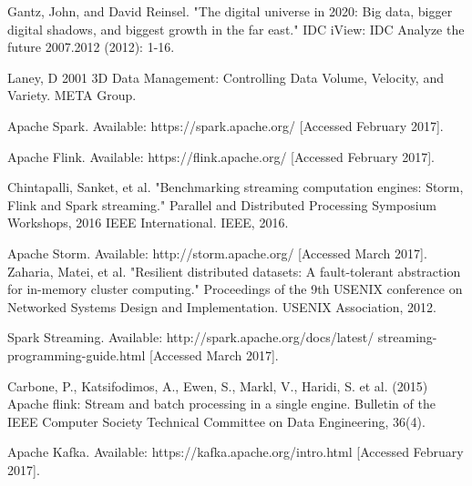 \documentclass[]{article}
\begin{document}
\begin{thebibliography}{[MT1]}
%
Gantz, John, and David Reinsel. "The digital universe in 2020: Big data, bigger digital shadows, and biggest growth in the far east." IDC iView: IDC Analyze the future 2007.2012 (2012): 1-16.

Laney, D 2001 3D Data Management: Controlling Data Volume, Velocity, and Variety. META Group.

Apache Spark. Available: https://spark.apache.org/ [Accessed February 2017].

Apache Flink. Available: https://flink.apache.org/ [Accessed February 2017].

Chintapalli, Sanket, et al. "Benchmarking streaming computation engines: Storm, Flink and Spark streaming." Parallel and Distributed Processing Symposium Workshops, 2016 IEEE International. IEEE, 2016.

Apache Storm. Available: http://storm.apache.org/ [Accessed March 2017].
Zaharia, Matei, et al. "Resilient distributed datasets: A fault-tolerant abstraction for in-memory cluster computing." Proceedings of the 9th USENIX conference on Networked Systems Design and Implementation. USENIX Association, 2012.

Spark Streaming. Available: http://spark.apache.org/docs/latest/
streaming-programming-guide.html [Accessed March 2017].

Carbone, P., Katsifodimos, A., Ewen, S., Markl, V., Haridi, S. et al. (2015)
Apache flink: Stream and batch processing in a single engine.
Bulletin of the IEEE Computer Society Technical Committee on Data Engineering, 36(4).

Apache Kafka. Available: https://kafka.apache.org/intro.html [Accessed February 2017].

%
\end{thebibliography}
\end{document}
